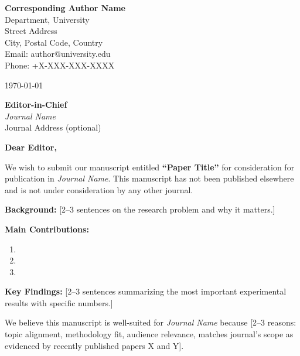 \documentclass[11pt]{article}
\begin{document}
\begin{flushleft}
\noindent\textbf{Corresponding Author Name}\\
Department, University\\
Street Address\\
City, Postal Code, Country\\
Email: author@university.edu\\
Phone: +X-XXX-XXX-XXXX
\end{flushleft}

\vspace{12pt}
\today

\vspace{12pt}
\begin{flushleft}
\noindent\textbf{Editor-in-Chief}\\
\textit{Journal Name}\\
Journal Address (optional)
\end{flushleft}

\vspace{18pt}
\noindent\textbf{Dear Editor,}

\vspace{6pt}

\noindent
We wish to submit our manuscript entitled \textbf{``Paper Title''}
for consideration for publication in \textit{Journal Name}.
This manuscript has not been published elsewhere and is not under
consideration by any other journal.

\vspace{6pt}

\noindent
\textbf{Background:} [2--3 sentences on the research problem and
why it matters.]

\noindent
\textbf{Main Contributions:}
\begin{enumerate}
    \item [Contribution 1 — specific, evidence-backed, no overclaim.]
    \item [Contribution 2.]
    \item [Contribution 3.]
\end{enumerate}

\noindent
\textbf{Key Findings:} [2--3 sentences summarizing the most
important experimental results with specific numbers.]

\vspace{6pt}

\noindent
We believe this manuscript is well-suited for \textit{Journal Name}
because [2--3 reasons: topic alignment, methodology fit, audience
relevance, matches journal's scope as evidenced by recently
published papers X and Y].
\end{document}
